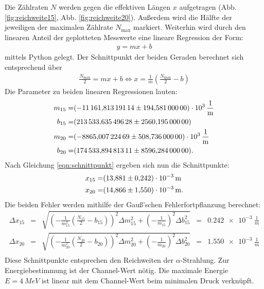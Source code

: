 Die Zählraten $N$ werden gegen die effektiven Längen $x$ aufgetragen (Abb. \ref{fig:reichweite15}, Abb. \ref{fig:reichweite20}).
Außerdem wird die Hälfte der jeweiligen der maximalen Zählrate $N_{\text{max}}$ markiert.
Weiterhin wird durch den linearen Anteil der geplotteten Messwerte eine lineare Regression der Form:
\begin{align*}
  y=mx+b
\end{align*}
mittels Python gelegt.
Der Schnittpunkt der beiden Geraden berechnet sich entsprechend über
\begin{align}
  \frac{N_{\text{max}}}{2}=mx+b \Leftrightarrow x= \frac{1}{m} \left( \frac{N_{\text{max}}}{2}-b \right)
\label{eqn:schnittpunkt}
\end{align}
Die Parameter zu beiden linearen Regressionen lauten:
\begin{align*}
  m_{\text{15}}=& \SI{-11161.81319114 \pm 194.581e3}{\frac{1}{m}}\\
  b_{\text{15}}=& \SI{213533.63549628 \pm 2560.195}{}\\
  m_{\text{20}}=& \SI{-8865.00722469 \pm 508.736e3}{\frac{1}{m}}\\
  b_{\text{20}}=& \SI{174533.89481311 \pm 8596.284}{}.\\
\end{align*}
Nach Gleichung \eqref{eqn:schnittpunkt} ergeben sich nun die Schnittpunkte:
\begin{align*}
x_{\text{15}}=& \SI{13.881 \pm 0.242e-3}{m} \\
x_{\text{20}}=& \SI{14.866 \pm 1.550e-3}{m}.\\
\end{align*}
Die beiden Fehler werden mithilfe der Gauß'schen Fehlerfortpflanzung berechnet:
\begin{align*}
  \Delta x_{\text{15}}  &=&  \sqrt{ \left(-\frac{1}{m_{\text{15}}^2} \left( \frac{N_{\text{15}}}{2} - b_{\text{15}} \right) \right)^2 \Delta m_{\text{15}}^2 + \left(-\frac{1}{m_{\text{15}}} \right)^2 \Delta b_{\text{15}}^2}  &=& \SI{0.242e-3}{\frac{1}{m}}\\
  \Delta x_{\text{20}}  &=& \sqrt{ \left( -\frac{1}{m_{\text{20}}^2} \left( \frac{N_{\text{20}}}{2} - b_{\text{20}} \right) \right)^2 \Delta m_{\text{20}}^2 + \left(-\frac{1}{m_{\text{20}}} \right)^2 \Delta b_{\text{20}}^2}  &=& \SI{1.550e-3}{\frac{1}{m}}\\
\end{align*}
Diese Schnittpunkte entsprechen den Reichweiten der $\alpha$-Strahlung.
Zur Energiebestimmung ist der Channel-Wert nötig.
Die maximale Energie $E=\SI{4}{MeV}$ ist linear mit dem Channel-Wert beim minimalen Druck verknüpft.
